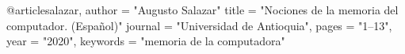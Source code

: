@article{salazar,
    author = "Augusto Salazar"
    title = "{Nociones de la memoria del computador}. ({Español})"
    journal = "Universidad de Antioquia",
    pages = "1--13",
    year = "2020",
    keywords = "memoria de la computadora"
}
